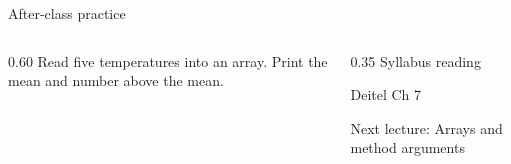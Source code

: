 \documentclass[10pt,aspectratio=169]{beamer}
\begin{document}
\begin{frame}[fragile,t]{After-class practice}
\begin{columns}[T,onlytextwidth]\begin{column}{0.60\textwidth}
Read five temperatures into an array. Print the mean and number above the mean.
\end{column}\begin{column}{0.35\textwidth}\small
Syllabus reading\par Deitel Ch 7

Next lecture: Arrays and method arguments
\end{column}\end{columns}
\end{frame}
\end{document}

